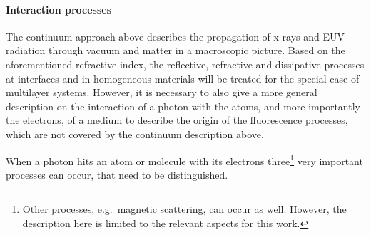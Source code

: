\paragraph{Interaction processes}
The continuum approach above describes the propagation of x-rays and EUV radiation through vacuum and matter in a macroscopic picture. Based on the aforementioned refractive index, the reflective, refractive and dissipative processes at interfaces and in homogeneous materials will be treated for the special case of multilayer systems. However, it is necessary to also give a more general description on the interaction of a photon with the atoms, and more importantly the electrons, of a medium to describe the origin of the fluorescence processes, which are not covered by the continuum description above.

When a photon hits an atom or molecule with its electrons three\footnote{Other processes, e.g.~magnetic scattering, can occur as well. However, the description here is limited to the relevant aspects for this work.} very important processes can occur, that need to be distinguished.

